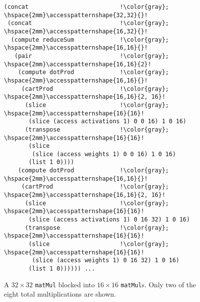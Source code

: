 \begin{figure}
\begin{lstlisting}[escapechar=!]
(concat                          !\color{gray}; \hspace{2mm}\accesspatternshape{32,32}{}!
 (concat                         !\color{gray}; \hspace{2mm}\accesspatternshape{16,32}{}!
  (compute reduceSum             !\color{gray}; \hspace{2mm}\accesspatternshape{16,16}{}!
   (pair                         !\color{gray}; \hspace{2mm}\accesspatternshape{16,16}{2}!
    (compute dotProd             !\color{gray}; \hspace{2mm}\accesspatternshape{16,16}{}!
     (cartProd                   !\color{gray}; \hspace{2mm}\accesspatternshape{16,16}{2, 16}!
      (slice                     !\color{gray}; \hspace{2mm}\accesspatternshape{16}{16}!
       (slice (access activations 1) 0 0 16) 1 0 16)
      (transpose                 !\color{gray}; \hspace{2mm}\accesspatternshape{16}{16}!
       (slice 
        (slice (access weights 1) 0 0 16) 1 0 16)
       (list 1 0))))
    (compute dotProd             !\color{gray}; \hspace{2mm}\accesspatternshape{16,16}{}!
     (cartProd                   !\color{gray}; \hspace{2mm}\accesspatternshape{16,16}{2, 16}!
      (slice                     !\color{gray}; \hspace{2mm}\accesspatternshape{16}{16}!
       (slice (access activations 1) 0 16 32) 1 0 16)
      (transpose                 !\color{gray}; \hspace{2mm}\accesspatternshape{16}{16}!
       (slice                    !\color{gray}; \hspace{2mm}\accesspatternshape{16}{16}!
        (slice (access weights 1) 0 16 32) 1 0 16)
       (list 1 0)))))) ...
  \end{lstlisting}
  \vspace{-2em}
  \caption{A $32\times32$ \texttt{matMul}
  blocked into $16\times16$ \texttt{matMul}s.
  Only two of the eight total multiplications are shown.
  }
  \label{fig:matmul-rewritten}
  \vspace{-1em}
\end{figure}


